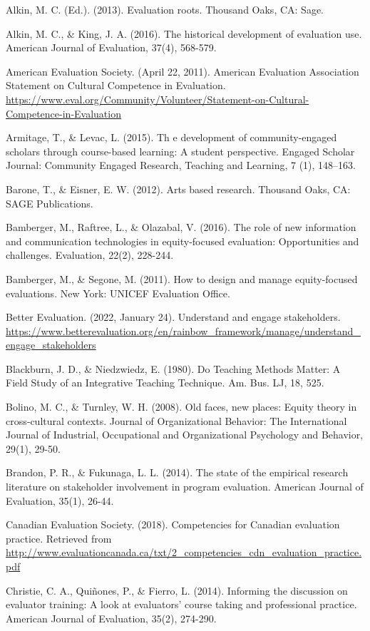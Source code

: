 \documentclass[
]{book}
\begin{document}
Alkin, M. C. (Ed.). (2013). Evaluation roots. Thousand Oaks, CA: Sage.

Alkin, M. C., \& King, J. A. (2016). The historical development of evaluation use. American Journal of Evaluation, 37(4), 568-579.

American Evaluation Society. (April 22, 2011). American Evaluation Association Statement on Cultural Competence in Evaluation. \url{https://www.eval.org/Community/Volunteer/Statement-on-Cultural-Competence-in-Evaluation}

Armitage, T., \& Levac, L. (2015). Th e development of community-engaged scholars through course-based learning: A student perspective. Engaged Scholar Journal: Community Engaged Research, Teaching and Learning, 7 (1), 148--163.

Barone, T., \& Eisner, E. W. (2012). Arts based research. Thousand Oaks, CA: SAGE Publications.

Bamberger, M., Raftree, L., \& Olazabal, V. (2016). The role of new information and communication technologies in equity-focused evaluation: Opportunities and challenges. Evaluation, 22(2), 228-244.

Bamberger, M., \& Segone, M. (2011). How to design and manage equity-focused evaluations. New York: UNICEF Evaluation Office.

Better Evaluation. (2022, January 24). Understand and engage stakeholders. \url{https://www.betterevaluation.org/en/rainbow_framework/manage/understand_engage_stakeholders}

Blackburn, J. D., \& Niedzwiedz, E. (1980). Do Teaching Methods Matter: A Field Study of an Integrative Teaching Technique. Am. Bus. LJ, 18, 525.

Bolino, M. C., \& Turnley, W. H. (2008). Old faces, new places: Equity theory in cross‐cultural contexts. Journal of Organizational Behavior: The International Journal of Industrial, Occupational and Organizational Psychology and Behavior, 29(1), 29-50.

Brandon, P. R., \& Fukunaga, L. L. (2014). The state of the empirical research literature on stakeholder involvement in program evaluation. American Journal of Evaluation, 35(1), 26-44.

Canadian Evaluation Society. (2018). Competencies for Canadian evaluation practice. Retrieved from \url{http://www.evaluationcanada.ca/txt/2_competencies_cdn_evaluation_practice.pdf}

Christie, C. A., Quiñones, P., \& Fierro, L. (2014). Informing the discussion on evaluator training: A look at evaluators' course taking and professional practice. American Journal of Evaluation, 35(2), 274-290.
\end{document}
